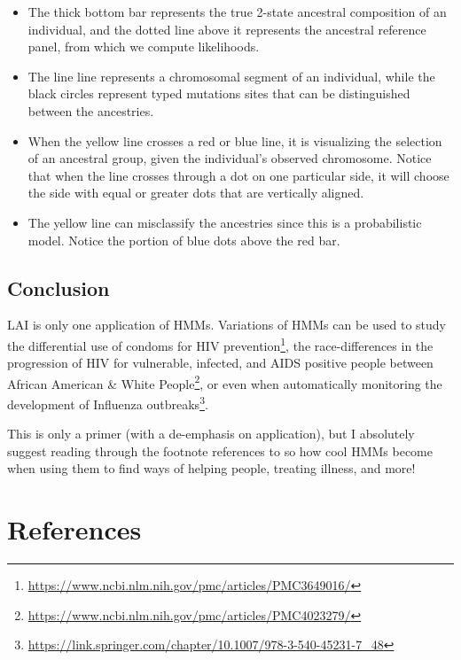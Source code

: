 \documentclass[
]{book}
\providecommand{\tightlist}{%
  \setlength{\itemsep}{0pt}\setlength{\parskip}{0pt}}
\begin{document}
\begin{itemize}
\tightlist
\item
  The thick bottom bar represents the true 2-state ancestral composition of an individual, and the dotted line above it represents the ancestral reference panel, from which we compute likelihoods.
\item
  The line line represents a chromosomal segment of an individual, while the black circles represent typed mutations sites that can be distinguished between the ancestries.
\item
  When the yellow line crosses a red or blue line, it is visualizing the selection of an ancestral group, given the individual's observed chromosome. Notice that when the line crosses through a dot on one particular side, it will choose the side with equal or greater dots that are vertically aligned.
\item
  The yellow line can misclassify the ancestries since this is a probabilistic model. Notice the portion of blue dots above the red bar.
\end{itemize}

\hypertarget{conclusion-2}{%
\subsection{Conclusion}\label{conclusion-2}}

LAI is only one application of HMMs. Variations of HMMs can be used to study the differential use of condoms for HIV prevention\footnote{\url{https://www.ncbi.nlm.nih.gov/pmc/articles/PMC3649016/}}, the race-differences in the progression of HIV for vulnerable, infected, and AIDS positive people between African American \& White People\footnote{\url{https://www.ncbi.nlm.nih.gov/pmc/articles/PMC4023279/}}, or even when automatically monitoring the development of Influenza outbreaks\footnote{\url{https://link.springer.com/chapter/10.1007/978-3-540-45231-7_48}}.

This is only a primer (with a de-emphasis on application), but I absolutely suggest reading through the footnote references to so how cool HMMs become when using them to find ways of helping people, treating illness, and more!

\hfill\break

\hypertarget{references-2}{%
\section*{References}\label{references-2}}

  
\end{document}
